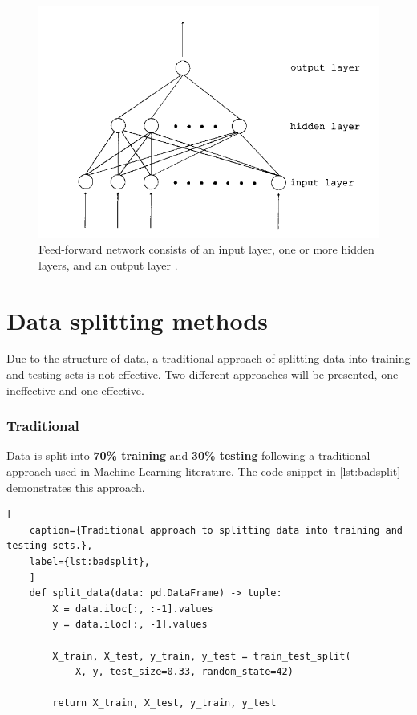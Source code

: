         \begin{figure}[H]
            \centering
            \includegraphics[width=.7\textwidth]{../src/resources/images/models/feedforward.png}
            \caption{
                Feed-forward network consists of an input layer, one or more hidden layers, and an output layer \cite{svozil_introduction_1997}.
            }
            \label{fig:multi_layer_perceptron}
        \end{figure}
    
    \newpage
        
        
    \section{Data splitting methods}
        
            Due to the structure of data, a traditional approach of splitting data into training and testing sets is not effective. Two different approaches will be presented, one ineffective and one effective.

            \subsubsection{Traditional} \label{sec:badsplit}
                        
                    Data is split into \textbf{70\% training} and \textbf{30\% testing} following a traditional approach used in Machine Learning literature. The code snippet in \ref{lst:badsplit} demonstrates this approach. 
            
\begin{lstlisting}[
    caption={Traditional approach to splitting data into training and testing sets.}, 
    label={lst:badsplit},
    ]            
    def split_data(data: pd.DataFrame) -> tuple:        
        X = data.iloc[:, :-1].values
        y = data.iloc[:, -1].values
        
        X_train, X_test, y_train, y_test = train_test_split(
            X, y, test_size=0.33, random_state=42)
        
        return X_train, X_test, y_train, y_test
\end{lstlisting}
                
